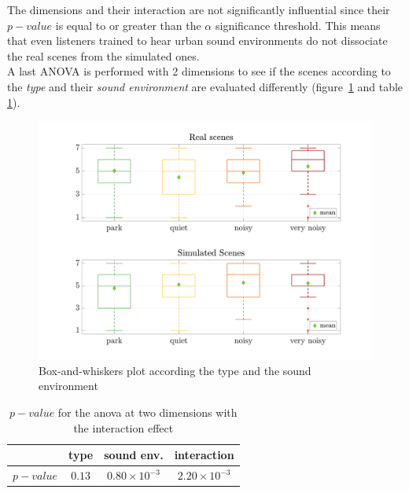 \documentclass[a4,11pt,twocolumn]{article}
\begin{document}
The dimensions and their interaction are not significantly influential since their $ p-value $ is equal to or greater than the $ \alpha$ significance threshold. This means that even listeners trained to hear urban sound environments do not dissociate the real scenes from the simulated ones.\\

A last ANOVA is performed with 2 dimensions to see if the scenes according to the \textit{type} and their \textit{sound environment} are evaluated differently (figure~\ref{fig:boxplot_type_ambience} and table \ref{tab:p_value_type_ambience}). 

\begin{figure}[h]
\centering
\includegraphics[width=\linewidth]{./pictures/testPerceptif_boxplotAmbianceCOLOR_EN.pdf}
\caption{Box-and-whiskers plot according the type and the sound environment}
\label{fig:boxplot_type_ambience}
\end{figure}

\begin{table}[h]
\centering
\begin{tabular}{cccc}
\cline{2-4}
          & type   & sound env. & interaction \\
\hline
$p-value$ & $0.13$ & $0.80 \times 10^{-3}$     & $2.20 \times 10^{-3}$ \\
\hline    
\end{tabular}
\caption{$p-value$ for the anova at two dimensions with the interaction effect}
\label{tab:p_value_type_ambience}
\end{table}
\end{document}
